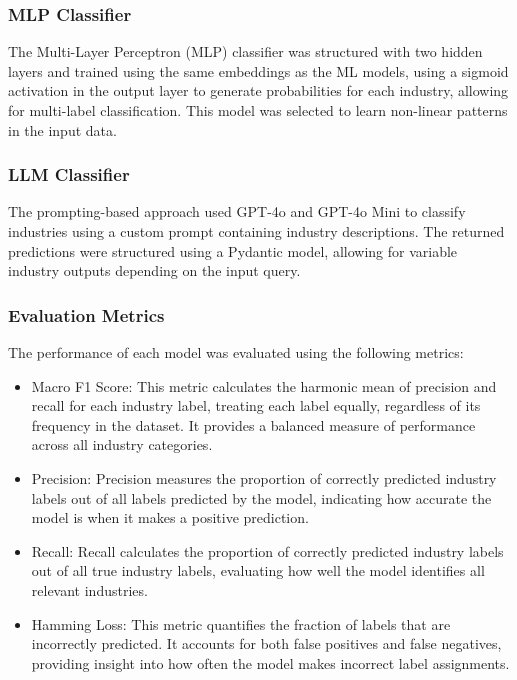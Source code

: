 \subsubsection{MLP Classifier}

The Multi-Layer Perceptron (MLP) classifier was structured with two hidden layers and trained using the same embeddings as the ML models, using a sigmoid activation in the output layer to generate probabilities for each industry, allowing for multi-label classification. This model was selected to learn non-linear patterns in the input data.

\subsubsection{LLM Classifier} \label{llm_classifier}

The prompting-based approach used GPT-4o and GPT-4o Mini to classify industries using a custom prompt containing industry descriptions. The returned predictions were structured using a Pydantic model, allowing for variable industry outputs depending on the input query.


\subsubsection{Evaluation Metrics} 

The performance of each model was evaluated using the following metrics: \begin{itemize} \item Macro F1 Score: This metric calculates the harmonic mean of precision and recall for each industry label, treating each label equally, regardless of its frequency in the dataset. It provides a balanced measure of performance across all industry categories. \item Precision: Precision measures the proportion of correctly predicted industry labels out of all labels predicted by the model, indicating how accurate the model is when it makes a positive prediction. \item Recall: Recall calculates the proportion of correctly predicted industry labels out of all true industry labels, evaluating how well the model identifies all relevant industries. \item Hamming Loss: This metric quantifies the fraction of labels that are incorrectly predicted. It accounts for both false positives and false negatives, providing insight into how often the model makes incorrect label assignments. \end{itemize}


